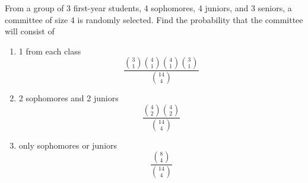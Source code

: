 \item From a group of 3 first-year students, 4 sophomores, 4 juniors, and 3 seniors, a committee of size 4 is randomly selected. Find the probability that the committee will consist of
\begin{enumerate}
    \item 1 from each class
    \[ \frac{\binom{3}{1} \binom{4}{1} \binom{4}{1} \binom{3}{1}}{\binom{14}{4}} \]
    \item 2 sophomores and 2 juniors
    \[ \frac{\binom{4}{2} \binom{4}{2}}{\binom{14}{4}} \]
    \item only sophomores or juniors
    \[ \frac{\binom{8}{4}}{\binom{14}{4}} \]
\end{enumerate}